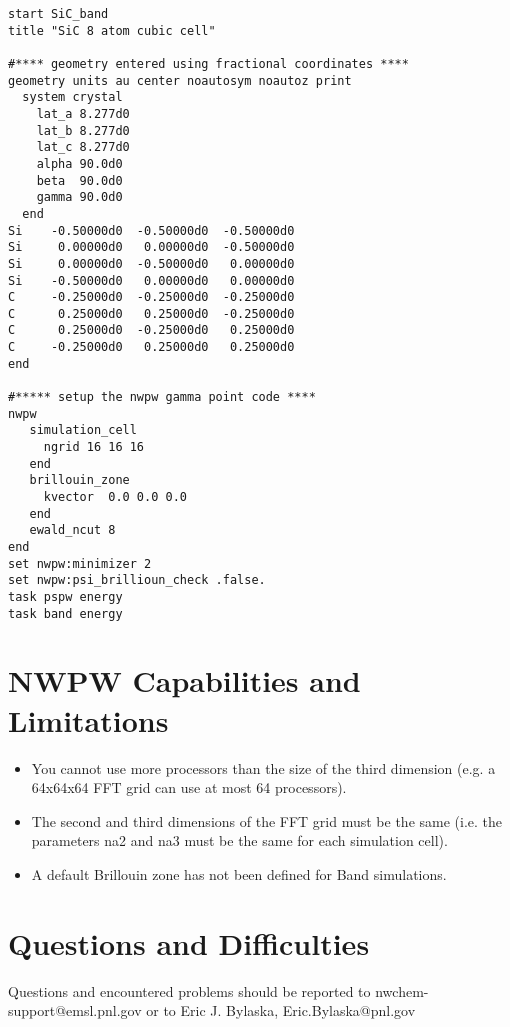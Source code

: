 \begin{verbatim}
start SiC_band
title "SiC 8 atom cubic cell"

#**** geometry entered using fractional coordinates ****
geometry units au center noautosym noautoz print 
  system crystal 
    lat_a 8.277d0
    lat_b 8.277d0
    lat_c 8.277d0
    alpha 90.0d0
    beta  90.0d0
    gamma 90.0d0
  end
Si    -0.50000d0  -0.50000d0  -0.50000d0
Si     0.00000d0   0.00000d0  -0.50000d0
Si     0.00000d0  -0.50000d0   0.00000d0
Si    -0.50000d0   0.00000d0   0.00000d0
C     -0.25000d0  -0.25000d0  -0.25000d0
C      0.25000d0   0.25000d0  -0.25000d0
C      0.25000d0  -0.25000d0   0.25000d0
C     -0.25000d0   0.25000d0   0.25000d0
end

#***** setup the nwpw gamma point code ****
nwpw
   simulation_cell
     ngrid 16 16 16
   end
   brillouin_zone
     kvector  0.0 0.0 0.0
   end
   ewald_ncut 8
end
set nwpw:minimizer 2
set nwpw:psi_brillioun_check .false.
task pspw energy
task band energy
\end{verbatim}


\section{NWPW Capabilities and Limitations}
\label{sec:pspw_limits}
\normalsize

\begin{itemize}
\item You cannot use more processors than the size of the third dimension 
  (e.g. a 64x64x64 FFT grid can use at most 64 processors).
\item The second and third dimensions of the FFT grid must be the same 
  (i.e. the parameters na2 and na3 must be the same for each simulation cell).
\item A default Brillouin zone has not been defined for Band simulations.
\end{itemize}


\section{Questions and Difficulties}
\normalsize

Questions and encountered problems should be reported to 
nwchem-support@emsl.pnl.gov 
or to Eric J. Bylaska, Eric.Bylaska@pnl.gov





